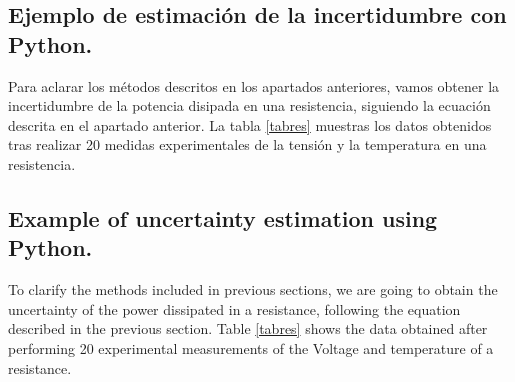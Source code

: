 \begin{paracol}{2}
\subsection{Ejemplo de estimación de la incertidumbre con Python.}

Para aclarar los métodos descritos en los apartados anteriores, vamos obtener la incertidumbre de la potencia disipada en una resistencia, siguiendo la ecuación descrita en el apartado anterior. La tabla \ref{tabres} muestras los datos obtenidos tras realizar 20 medidas experimentales de la tensión y la temperatura en una resistencia.
\switchcolumn
\subsection{Example of uncertainty estimation using Python.}

To clarify the methods included in previous sections, we are going to obtain the uncertainty of the power dissipated in a resistance, following the equation described in the previous section. Table \ref{tabres} shows the data obtained after performing 20 experimental measurements of the Voltage and temperature of a resistance. 
\end{paracol}
